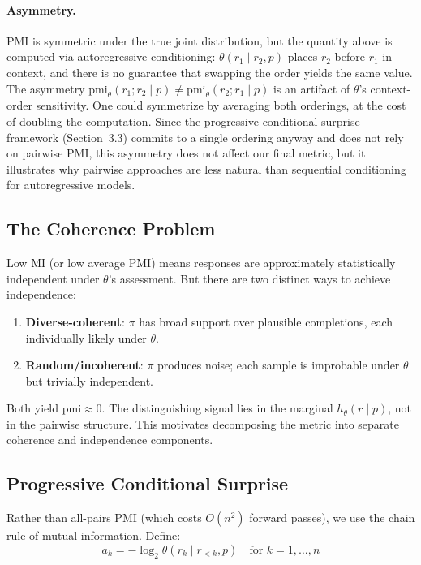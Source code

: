 \documentclass[11pt]{article}
\newcommand{\pmi}{\mathrm{pmi}}
\begin{document}
\paragraph{Asymmetry.} PMI is symmetric under the true joint distribution, but the quantity above is computed via autoregressive conditioning: $\theta(r_1 \mid r_2, p)$ places $r_2$ before $r_1$ in context, and there is no guarantee that swapping the order yields the same value. The asymmetry $\pmi_\theta(r_1; r_2 \mid p) \neq \pmi_\theta(r_2; r_1 \mid p)$ is an artifact of $\theta$'s context-order sensitivity. One could symmetrize by averaging both orderings, at the cost of doubling the computation. Since the progressive conditional surprise framework (Section~3.3) commits to a single ordering anyway and does not rely on pairwise PMI, this asymmetry does not affect our final metric, but it illustrates why pairwise approaches are less natural than sequential conditioning for autoregressive models.

\subsection{The Coherence Problem}\label{sec:coherence-problem}

Low MI (or low average PMI) means responses are approximately statistically independent under $\theta$'s assessment. But there are two distinct ways to achieve independence:
\begin{enumerate}[nosep]
    \item \textbf{Diverse-coherent}: $\pi$ has broad support over plausible completions, each individually likely under $\theta$.
    \item \textbf{Random/incoherent}: $\pi$ produces noise; each sample is improbable under $\theta$ but trivially independent.
\end{enumerate}

Both yield $\pmi \approx 0$. The distinguishing signal lies in the marginal $h_\theta(r \mid p)$, not in the pairwise structure. This motivates decomposing the metric into separate coherence and independence components.

\subsection{Progressive Conditional Surprise}

Rather than all-pairs PMI (which costs $O(n^2)$ forward passes), we use the chain rule of mutual information. Define:
\begin{equation}\label{eq:ak}
    a_k = -\log_2 \theta(r_k \mid r_{<k}, p) \quad \text{for } k = 1, \ldots, n
\end{equation}
\end{document}
